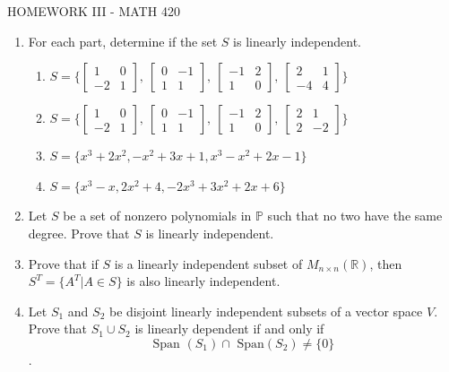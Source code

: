 \documentclass{article}
\begin{document}
\centerline{HOMEWORK III - MATH 420}
\begin{enumerate}
\item
For each part, determine if the set $S$ is linearly independent.
\begin{enumerate}
\item $S=\{\left[\begin{array}{cc}
1&0\\-2&1\end{array}\right],\ \left[\begin{array}{cc}
0&-1\\1&1\end{array}\right], \ \left[ \begin{array}{cc}
-1&2\\1&0\end{array}\right]
, \ \left[ \begin{array}{cc}
2&1\\-4&4\end{array}\right]\}$
\item $S=\{\left[\begin{array}{cc}
1&0\\-2&1\end{array}\right],\ \left[\begin{array}{cc}
0&-1\\1&1\end{array}\right], \ \left[ \begin{array}{cc}
-1&2\\1&0\end{array}\right]
, \ \left[ \begin{array}{cc}
2&1\\2&-2\end{array}\right]\}$
\item $S=\{x^3+2x^2, -x^2+3x+1,x^3-x^2+2x-1\}$
\item  $S=\{x^3-x, 2x^2+4,-2x^3+3x^2+2x+6\}$
\end{enumerate}

\item Let $S$ be a set of nonzero polynomials in $\mathbb{P}$ such that no two have the same degree. Prove that $S$ is linearly independent.


\item Prove that if $S$ is a linearly independent subset of $M_{n\times n}(\mathbb{R})$, then $S^T=\{A^T|A\in S\}$ is also linearly independent.

 \item Let $S_1$  and $S_2$
 be disjoint linearly independent subsets of a vector space $V$. Prove that
$S_1\cup S_2$ is linearly dependent if and only if $$\mbox{Span }(S_1)\cap\mbox{ Span} (S_2)\neq \{0\}$$.


     \end{enumerate}
     
\end{document}

